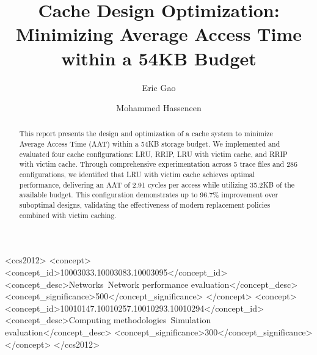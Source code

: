 \documentclass[sigconf,nonacm,natbib=false]{acmart}
\begin{document}
\title{Cache Design Optimization: Minimizing Average Access Time within a 54KB Budget}

\author{Eric Gao}

\author{Mohammed Hasseneen}
\authornotemark[1]


\begin{abstract}
This report presents the design and optimization of a cache system to minimize Average Access Time (AAT) within a 54KB storage budget. We implemented and evaluated four cache configurations: LRU, RRIP, LRU with victim cache, and RRIP with victim cache. Through comprehensive experimentation across 5 trace files and 286 configurations, we identified that LRU with victim cache achieves optimal performance, delivering an AAT of 2.91 cycles per access while utilizing 35.2KB of the available budget. This configuration demonstrates up to 96.7\% improvement over suboptimal designs, validating the effectiveness of modern replacement policies combined with victim caching.
\end{abstract}

\begin{CCSXML}
<ccs2012>
 <concept>
  <concept_id>10003033.10003083.10003095</concept_id>
  <concept_desc>Networks~Network performance evaluation</concept_desc>
  <concept_significance>500</concept_significance>
 </concept>
 <concept>
  <concept_id>10010147.10010257.10010293.10010294</concept_id>
  <concept_desc>Computing methodologies~Simulation evaluation</concept_desc>
  <concept_significance>300</concept_significance>
 </concept>
</ccs2012>
\end{CCSXML}
\end{document}
